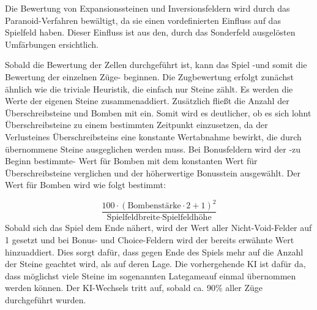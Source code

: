 \documentclass[12pt,a4paper]{article}
\begin{document}
Die Bewertung von Expansionssteinen und Inversionsfeldern wird durch das Paranoid-Verfahren bewältigt, da sie einen vordefinierten Einfluss auf das Spielfeld haben. Dieser Einfluss ist aus den, durch das Sonderfeld ausgelösten Umfärbungen ersichtlich.

Sobald die Bewertung der Zellen durchgeführt ist, kann das Spiel -und somit die Bewertung der einzelnen Züge- beginnen. Die Zugbewertung erfolgt zunächst ähnlich wie die triviale Heuristik, die einfach nur Steine zählt. Es werden die Werte der eigenen Steine zusammenaddiert. Zusätzlich fließt die Anzahl der Überschreibsteine und Bomben mit ein. Somit wird es deutlicher, ob es sich lohnt Überschreibsteine zu einem bestimmten Zeitpunkt einzusetzen, da der \glqq Verlust\grqq eines Überschreibsteins eine konstante Wertabnahme bewirkt, die durch übernommene Steine ausgeglichen werden muss.
Bei Bonusfeldern wird der -zu Beginn bestimmte- Wert für Bomben mit dem konstanten Wert für Überschreibsteine verglichen und der höherwertige Bonusstein ausgewählt. Der Wert für Bomben wird wie folgt bestimmt:

\begin{equation*}
	\frac{100 \cdot (\text{Bombenstärke} \cdot 2 + 1)^2}{\text{Spielfeldbreite} \cdot \text{Spielfeldhöhe}}
\end{equation*}
\newline \newline %
Sobald sich das Spiel dem Ende nähert, wird der Wert aller Nicht-Void-Felder auf 1 gesetzt und bei Bonus- und Choice-Feldern wird der bereits erwähnte Wert hinzuaddiert. Dies sorgt dafür, dass gegen Ende des Spiels mehr auf die Anzahl der Steine geachtet wird, als auf deren Lage. Die vorhergehende KI ist dafür da, dass möglichst viele Steine im sogenannten \glqq Lategame\grqq auf einmal übernommen werden können. Der KI-Wechsels tritt auf, sobald ca. 90\% aller Züge durchgeführt wurden.
\newpage
\end{document}
